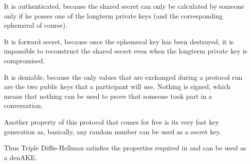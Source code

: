 It is authenticated, because the shared secret can only be calculated by someone
only if he posses one of the longterm private keys (and the corresponding ephemeral
of course).

It is forward secret, because once the ephemeral key has been destroyed, it is
impossible to reconstruct the shared secret even when the longterm
private key is compromised.

It is deniable, because the only values that are exchanged during a protocol run
are the two public keys that a participant will use. Nothing is signed, which means
that nothing can be used to prove that someone took part in a conversation.

Another property of this protocol that comes for free is its very fast key generation
as, basically, any random number can be used as a secret key.

Thus Triple Diffie-Hellman satisfies the properties required in \cite{mpotr} and
can be used as a denAKE.


